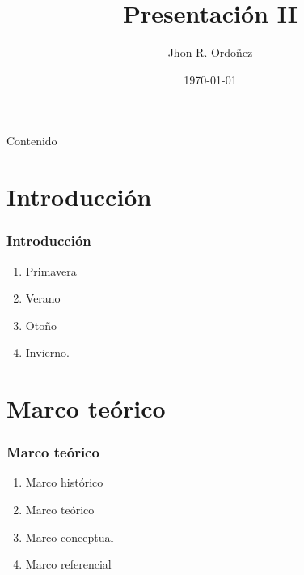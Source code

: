 \documentclass[12pt, aspectratio = 169]{beamer}
\title{Presentación II}
\author{Jhon R. Ordoñez}
\date{\today}
\begin{document}
    \begin{frame}
        \maketitle
    \end{frame}
    \begin{frame}{Contenido}
        \tableofcontents
    \end{frame}
    \section{Introducción}
        \begin{frame}[t]
            \frametitle{Introducción} \pause
            \begin{enumerate}
                \item Primavera \pause
                \item Verano \pause
                \item Otoño \pause
                \item Invierno.
            \end{enumerate}
        \end{frame}
    \section{Marco teórico}
        \begin{frame}[t]
            \frametitle{Marco teórico}
            \begin{enumerate}[<+->]
                \item Marco histórico
                \item Marco teórico
                \item Marco conceptual
                \item Marco referencial
            \end{enumerate}
        \end{frame}
\end{document}
